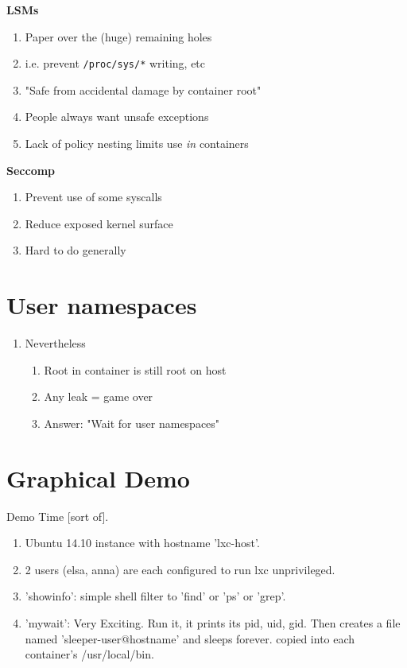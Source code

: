 \documentclass{beamer}
\begin{document}
\begin{frame}
\textbf{LSMs}
\begin{enumerate}
\item Paper over the (huge) remaining holes
\item i.e. prevent {\tt /proc/sys/*} writing, etc
\item "Safe from accidental damage by container root"
\item People always want unsafe exceptions
\item Lack of policy nesting limits use {\em in} containers
\end{enumerate}

\vspace{0.25in}

\textbf{Seccomp}
\begin{enumerate}
\item Prevent use of some syscalls
\item Reduce exposed kernel surface
\item Hard to do generally
\end{enumerate}
\end{frame}

\section{User namespaces}
\begin{frame}
\begin{enumerate}
\item Nevertheless
	\begin{enumerate}
	\item Root in container is still root on host
	\item Any leak = game over
	\item Answer: "Wait for user namespaces"
	\end{enumerate}
\end{enumerate}
\end{frame}

\section{Graphical Demo}
\begin{frame}
Demo Time [sort of].
\begin{enumerate}
   \item Ubuntu 14.10 instance with hostname 'lxc-host'.
   \item 2 users (elsa, anna) are each configured to run lxc unprivileged.
   \item 'showinfo': simple shell filter to 'find' or 'ps' or 'grep'.
   \item 'mywait': Very Exciting. Run it, it prints its pid, uid, gid.  Then creates a file named 'sleeper-user@hostname' and sleeps forever. copied into each container's /usr/local/bin.
\end{enumerate}
\end{frame}
\end{document}
